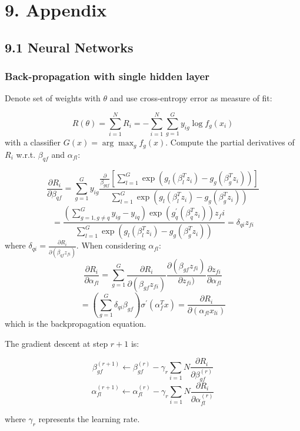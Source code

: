 \documentclass[12pt,]{article}
\title{}
\author{}
\date{}
\begin{document}
\hypertarget{appendix}{%
\section{9. Appendix}\label{appendix}}

\hypertarget{neural-networks}{%
\subsection{9.1 Neural Networks}\label{neural-networks}}

\hypertarget{back-propagation-with-single-hidden-layer}{%
\subsubsection{Back-propagation with single hidden
layer}\label{back-propagation-with-single-hidden-layer}}

Denote set of weights with \(\theta\) and use cross-entropy error as
measure of fit:

\[R(\theta)=\sum_{i=1}^{N}R_i =-\sum_{i=1}^{N}\sum_{g=1}^{G}y_{ig}\log{f_g(x_i)}\]
with a classifier \(G(x)=\arg\max_{g}f_g(x)\). Compute the partial
derivatives of \(R_i\) w.r.t. \(\beta_{qf}\) and \(\alpha_{fl}\):

\[\frac{\partial R_i}{\partial \beta_{qf}}=\sum_{g=1}^{G}y_{ig}\frac{\frac{\partial}{\beta_{gqf}}[\sum_{l=1}^{G}\exp(g_l(\beta_{l}^{T}z_i)-g_g(\beta_{g}^{T}z_i))]}{\sum_{l=1}^{G}\exp(g_l(\beta_{l}^{T}z_i)-g_g(\beta_{g}^{T}z_i))}\]
\[=\frac{(\sum_{g=1,g\neq q}^{G}y_{ig}-y_{iq})\exp(g_{q}^{'}(\beta_q^Tz_i))z_fi}{\sum_{l=1}^{G}\exp(g_l(\beta_{l}^{T}z_i)-g_g(\beta_{g}^{T}z_i))}=\delta_{qi}z_{fi}\]
where \(\delta_{qi}=\frac{\partial R_i}{\partial (\beta_{qf} z_{fi})}\).
When considering \(\alpha_{fl}\):
\[\frac{\partial R_i}{\partial \alpha_{fl}}=\sum_{g=1}^{G}\frac{\partial R_i}{\partial (\beta_{gf}z_{fi})}\frac{\partial (\beta_{gf}z_{fi})}{\partial z_{fi})}\frac{\partial z_{fi}}{\partial \alpha_{fl}}\]
\[= (\sum_{g=1}^{G}\delta_{qi}\beta_{gf})\sigma^{'}(\alpha_{f}^{T}x)=\frac{\partial R_i}{\partial (\alpha_{fl}x_{li})}\]
which is the backpropagation equation.

The gradient descent at step \(r+1\) is:

\[\beta_{gf}^{(r+1)}\leftarrow\beta_{gf}^{(r)}-\gamma_r\sum_{i=1}{N}\frac{\partial R_i}{\partial \beta_{gf}^{(r)}}\]
\[\alpha_{fl}^{(r+1)}\leftarrow\alpha_{fl}^{(r)}-\gamma_r\sum_{i=1}{N}\frac{\partial R_i}{\partial \alpha_{fl}^{(r)}}\]

where \(\gamma_r\) represents the learning rate.
\end{document}
